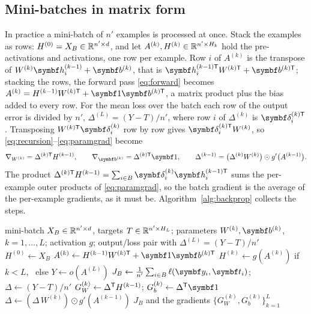 \documentclass[11pt]{article}
\newcommand{\hv}{\vect{h}}
\newcommand{\bv}{\vect{b}}
\newcommand{\yv}{\vect{y}}
\newcommand{\tvec}{\vect{t}}
\newcommand{\dv}{\vect{\delta}}
\newcommand{\onev}{\vect{1}}
\begin{document}
\subsection{Mini-batches in matrix form}\label{sec:matrix}

In practice a mini-batch of $n'$ examples is processed at once. Stack the examples as rows: $H^{(0)} = X_B \in
\mathbb{R}^{n' \times d}$, and let $A^{(k)}, H^{(k)} \in \mathbb{R}^{n' \times H_k}$ hold the pre-activations and activations, one row
per example. Row $i$ of $A^{(k)}$ is the transpose of $W^{(k)}\hv_i^{(k-1)} + \bv^{(k)}$, that is
$\hv_i^{(k-1)\mathsf{T}}W^{(k)\mathsf{T}} + \bv^{(k)\mathsf{T}}$; stacking the rows, the forward pass \eqref{eq:forward}
becomes $A^{(k)} = H^{(k-1)}W^{(k)\mathsf{T}} + \onev\bv^{(k)\mathsf{T}}$, a matrix product plus the bias added to every
row. For the mean loss over the batch each row of the output error is divided by $n'$, $\Delta^{(L)} = (Y - T)/n'$,
where row $i$ of $\Delta^{(k)}$ is $\dv_i^{(k)\mathsf{T}}$. Transposing $W^{(k)\mathsf{T}}\dv_i^{(k)}$ row by row gives
$\dv_i^{(k)\mathsf{T}}W^{(k)}$, so \eqref{eq:recursion}--\eqref{eq:paramgrad} become
\begin{equation}\label{eq:matrix}
  \nabla_{W^{(k)}} = \Delta^{(k)\mathsf{T}}H^{(k-1)}, \qquad \nabla_{\bv^{(k)}} = \Delta^{(k)\mathsf{T}}\onev, \qquad
  \Delta^{(k-1)} = \big(\Delta^{(k)}W^{(k)}\big) \odot g'\big(A^{(k-1)}\big) .
\end{equation}
The product $\Delta^{(k)\mathsf{T}}H^{(k-1)} = \sum_{i \in B}\dv^{(k)}_i\hv^{(k-1)\mathsf{T}}_i$ sums the per-example outer
products of \eqref{eq:paramgrad}, so the batch gradient is the average of the per-example gradients, as it must be.
Algorithm~\ref{alg:backprop} collects the steps.

\begin{algorithm}[H]
\caption{Forward and backward pass of an $L$-layer network on a mini-batch}\label{alg:backprop}
\begin{algorithmic}[1]
\Require mini-batch $X_B \in \mathbb{R}^{n' \times d}$, targets $T \in \mathbb{R}^{n' \times H_L}$; parameters $W^{(k)}, \bv^{(k)}$,
  $k = 1, \dots, L$; activation $g$; output/loss pair with $\Delta^{(L)} = (Y - T)/n'$
  \State $H^{(0)} \gets X_B$
   
    \State $A^{(k)} \gets H^{(k-1)}W^{(k)\mathsf{T}} + \onev\bv^{(k)\mathsf{T}}$ 
    \State $H^{(k)} \gets g(A^{(k)})$ if $k < L$, \ else $Y \gets o(A^{(L)})$
  \EndFor
  \State $J_B \gets \frac{1}{n'}\sum_{i \in B}\ell(\yv_i, \tvec_i)$; \quad $\Delta \gets (Y - T)/n'$ \Comment{\eqref{eq:deltaL}}
   
    \State $G_W^{(k)} \gets \Delta^{\mathsf{T}} H^{(k-1)}$; \quad $G_b^{(k)} \gets \Delta\T\onev$ 
      \State $\Delta \gets (\Delta\,W^{(k)}) \odot g'(A^{(k-1)})$ 
    \EndIf
  \EndFor
  \State \Return $J_B$ and the gradients $\{G_W^{(k)}, G_b^{(k)}\}_{k=1}^L$
\EndFunction
\end{algorithmic}
\end{algorithm}
\end{document}
